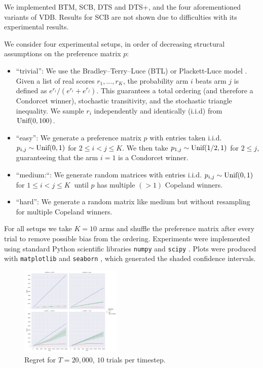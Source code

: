 \documentclass[10pt,twocolumn,letterpaper]{article}
\begin{document}
We implemented BTM, SCB, DTS and DTS+, and
the four aforementioned variants of VDB.
Results for SCB are not shown due to
difficulties with its experimental results.

We consider four experimental setups, in order of decreasing
structural assumptions on the preference matrix \( p \):
\begin{itemize}
  \item ``trivial'': We use the Bradley–Terry–Luce
    (BTL) or Plackett-Luce model \cite{saha2022versatile}.
    Given a list of real scores \( r_1, \dotsc, r_K \), the probability arm \(
    i \) beats arm \( j \) is defined as \( e^{r_i}/(e^{r_i} + e^{r_j}) \).
    This guarantees a total ordering (and therefore a Condorcet winner),
    stochastic transitivity, and the stochastic triangle inequality.
    We sample \( r_i \) independently and
    identically (i.i.d) from \( \operatorname{\text{Unif}}(0, 100) \).
  \item ``easy'': We generate a preference
    matrix \( p \) with entries taken i.i.d. \( p_{i, j}
    \sim \operatorname{\text{Unif}}(0, 1) \) for \( 2 \leq i < j \leq K \).
    We then take \( p_{1, j} \sim \operatorname{\text{Unif}}(1/2, 1) \) for \( 2 \leq j
    \), guaranteeing that the arm \( i = 1 \) is a Condorcet winner.
  \item ``medium:``: We generate random matrices with entries i.i.d. \(
    p_{i, j} \sim \operatorname{\text{Unif}}(0, 1) \) for \( 1 \leq i < j \leq K \ \) until
    \( p \) has multiple \( (> 1) \) Copeland winners.
  \item ``hard'': We generate a random matrix like medium
    but without resampling for multiple Copeland winners.
\end{itemize}

For all setups we take \( K = 10 \) arms and shuffle the preference
matrix after every trial to remove possible bias from the ordering.
Experiments were implemented using standard Python
scientific libraries \texttt{numpy} \cite{harris2020array}
and \texttt{scipy} \cite{virtanen2020scipy}.
Plots were produced with \texttt{matplotlib} \cite{hunter2007matplotlib}
and \texttt{seaborn} \cite{waskom2021seaborn},
which generated the shaded confidence intervals.

\begin{figure}
  \centering
  \includegraphics[width=0.43\textwidth]{figures/regret_2.png}
  \caption{%
    Regret for \( T = 20,000 \), \( 10 \) trials per timestep.
  }
  \label{fig:regret2}
\end{figure}
\end{document}
